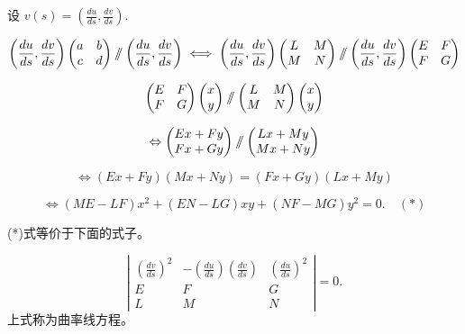 \documentclass[lang=cn,10pt,thmcnt=section]{elegantbook}
\begin{document}
设 \( v(s) = \left( \frac{du}{ds}, \frac{dv}{ds} \right) \).

\[
\left( \frac{du}{ds}, \frac{dv}{ds} \right) 
\begin{pmatrix}
a & b \\
c & d
\end{pmatrix} 
\mathbin{/\mkern-6mu/} 
\left( \frac{du}{ds}, \frac{dv}{ds} \right) 
\iff 
\left( \frac{du}{ds}, \frac{dv}{ds} \right) 
\begin{pmatrix}
L & M \\
M & N
\end{pmatrix} 
\mathbin{/\mkern-6mu/} 
\left( \frac{du}{ds}, \frac{dv}{ds} \right) 
\begin{pmatrix}
E & F \\
F & G
\end{pmatrix}
\]


\[
\left( \begin{matrix} E & F \\ F & G \end{matrix} \right)
\left( \begin{matrix} x \\ y \end{matrix} \right)
\mathbin{/\mkern-6mu/}
\left( \begin{matrix} L & M \\ M & N \end{matrix} \right)
\left( \begin{matrix} x \\ y \end{matrix} \right)
\]

\[
\Leftrightarrow 
\left( \begin{matrix} Ex + Fy \\ Fx + Gy \end{matrix} \right)
\mathbin{/\mkern-6mu/}
\left( \begin{matrix} Lx + My \\ Mx + Ny \end{matrix} \right)
\]

\[
\Leftrightarrow 
(Ex + Fy)(Mx + Ny) = (Fx + Gy)(Lx + My)
\]

\[
\Leftrightarrow 
(ME - LF)x^2 + (EN - LG)xy + (NF - MG)y^2 = 0. \quad (*)
\]

(*)式等价于下面的式子。

$$\left|\begin{matrix}
    \left(\frac{dv}{ds}\right)^2 & -\left(\frac{du}{ds}\right)\left(\frac{dv}{ds}\right) & \left(\frac{du}{ds}\right)^2 \\
    E & F & G \\
    L & M & N
    \end{matrix}\right| = 0.$$
上式称为曲率线方程。
\end{document}
